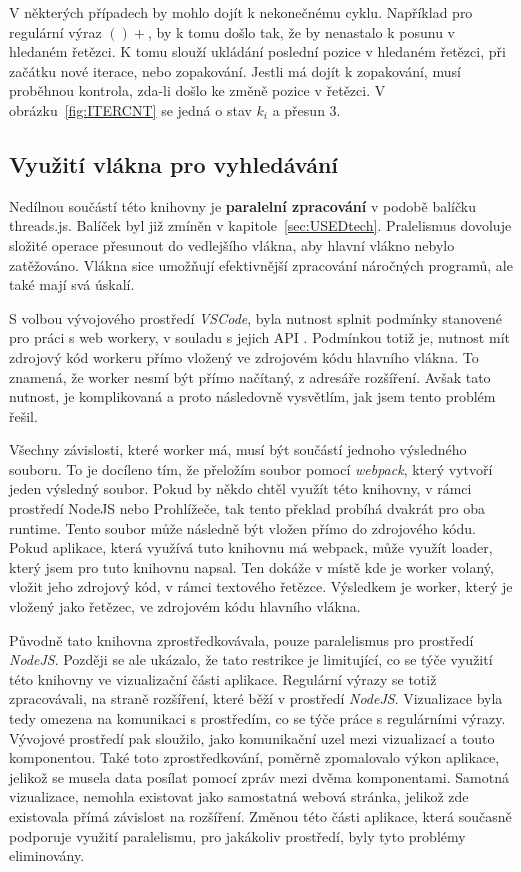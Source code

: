 V některých případech by mohlo dojít k nekonečnému cyklu.
Například pro regulární výraz $()+$, by k tomu došlo tak, že by nenastalo k posunu v hledaném řetězci.
K tomu slouží ukládání poslední pozice v hledaném řetězci, při začátku nové iterace, nebo zopakování.
Jestli má dojít k zopakování, musí proběhnou kontrola, zda-li došlo ke změně pozice v řetězci.
V obrázku~\ref{fig:ITERCNT} se jedná o stav $k_i$ a přesun $3$.

\subsection*{Využití vlákna pro vyhledávání}
Nedílnou součástí této knihovny je \textbf{paralelní zpracování} v podobě balíčku threads.js.
Balíček byl již zmíněn v kapitole~\ref{sec:USEDtech}.
Pralelismus dovoluje složité operace přesunout do vedlejšího vlákna, aby hlavní vlákno nebylo zatěžováno.
Vlákna sice umožňují efektivnější zpracování náročných programů, ale také mají svá úskalí.

S volbou vývojového prostředí \textit{VSCode}, byla nutnost splnit podmínky stanovené pro práci s web workery, v souladu s jejich API \cite{Microsoft_2021}. 
Podmínkou totiž je, nutnost mít zdrojový kód workeru přímo vložený ve zdrojovém kódu hlavního vlákna.
To znamená, že worker nesmí být přímo načítaný, z adresáře rozšíření.
Avšak tato nutnost, je komplikovaná a proto následovně vysvětlím, jak jsem tento problém řešil.

Všechny závislosti, které worker má, musí být součástí jednoho výsledného souboru.
To je docíleno tím, že přeložím soubor pomocí \textit{webpack}, který vytvoří jeden výsledný soubor.
Pokud by někdo chtěl využít této knihovny, v rámci prostředí NodeJS nebo Prohlížeče, 
tak tento překlad probíhá dvakrát pro oba runtime.
Tento soubor může následně být vložen přímo do zdrojového kódu.
Pokud aplikace, která využívá tuto knihovnu má webpack, 
může využít loader, který jsem pro tuto knihovnu napsal. 
Ten dokáže v místě kde je worker volaný, vložit jeho zdrojový kód, v rámci textového řetězce.
Výsledkem je worker, který je vložený jako řetězec, ve zdrojovém kódu hlavního vlákna.

Původně tato knihovna zprostředkovávala, pouze paralelismus pro prostředí \textit{NodeJS}.
Později se ale ukázalo, že tato restrikce je limitující, co se týče využití této knihovny ve vizualizační části aplikace.
Regulární výrazy se totiž zpracovávali, na straně rozšíření, které běží v prostředí \textit{NodeJS}.
Vizualizace byla tedy omezena na komunikaci s prostředím, co se týče práce s regulárními výrazy.
Vývojové prostředí pak sloužilo, jako komunikační uzel mezi vizualizací a touto komponentou.
Také toto zprostředkování, poměrně zpomalovalo výkon aplikace, jelikož se musela data posílat pomocí zpráv mezi dvěma komponentami.
Samotná vizualizace, nemohla existovat jako samostatná webová stránka, jelikož zde existovala přímá závislost na rozšíření.
Změnou této části aplikace, která současně podporuje využití paralelismu, pro jakákoliv prostředí, byly tyto problémy eliminovány.

